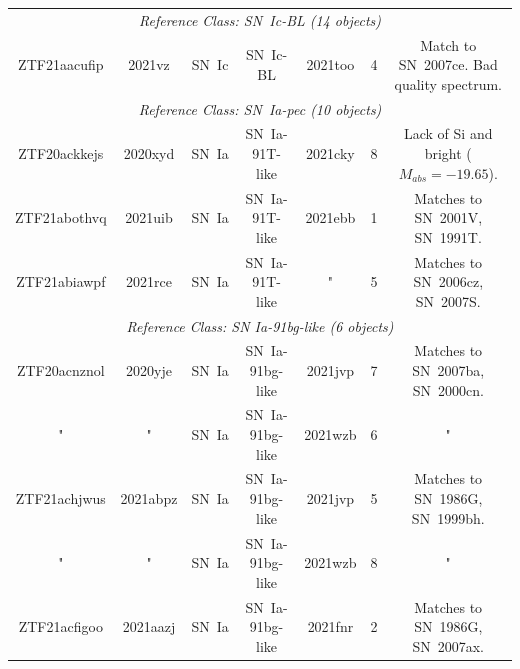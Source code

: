 \documentclass[twocolumn]{aastex63}
\begin{document}
\begin{table}[ht]
\begin{tabular}{ccccccc}
\multicolumn{7}{c}{\textit{Reference Class: SN~Ic-BL (14 objects)}} \\
ZTF21aacufip & 2021vz & SN~Ic & SN~Ic-BL & 2021too & 4 & Match to SN~2007ce. Bad quality spectrum. \\
\hline
\multicolumn{7}{c}{\textit{Reference Class: SN~Ia-pec (10 objects)}} \\
ZTF20ackkejs & 2020xyd & SN~Ia & SN~Ia-91T-like & 2021cky & 8 & Lack of Si and bright ($M_{abs}=-19.65$). \\
ZTF21abothvq & \cellcolor{pink} 2021uib & SN~Ia & SN~Ia-91T-like & 2021ebb & 1 & Matches to SN~2001V, SN~1991T. \\
ZTF21abiawpf & 2021rce & SN~Ia & SN~Ia-91T-like & " & 5 & Matches to SN~2006cz, SN~2007S. \\
\hline
\multicolumn{7}{c}{\textit{Reference Class: SN Ia-91bg-like (6 objects)}} \\
ZTF20acnznol & \cellcolor{pink} 2020yje & SN~Ia & SN~Ia-91bg-like & 2021jvp & 7 & Matches to SN~2007ba, SN~2000cn. \\
" & \cellcolor{pink} " & SN~Ia & SN~Ia-91bg-like & 2021wzb & 6 & " \\
ZTF21achjwus & \cellcolor{pink} 2021abpz & SN~Ia & SN~Ia-91bg-like & 2021jvp & 5 & Matches to SN~1986G, SN~1999bh. \\
" & \cellcolor{pink} " & SN~Ia & SN~Ia-91bg-like & 2021wzb & 8 & " \\
ZTF21acfigoo & 2021aazj & SN~Ia & SN~Ia-91bg-like & 2021fnr & 2 & Matches to SN~1986G, SN~2007ax. \\

\end{tabular}
\end{table}
\end{document}
